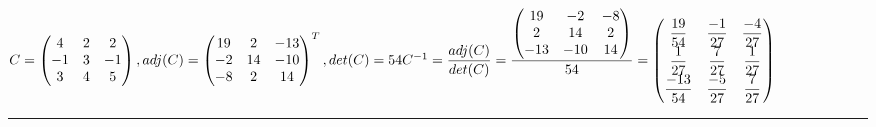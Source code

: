 \documentclass[fleqn]{article}
\begin{document}
\begin{enumerate}
    \textcolor{hwColor}{
      $
        C=\begin{pmatrix}
          4 & 2 & 2 \\ 
          -1 & 3 & -1 \\ 
          3 & 4 & 5
        \end{pmatrix}
        ,
        adj(C)=
        \begin{pmatrix}
        19 & 2 & -13 \\
        -2 & 14 & -10 \\
        -8 & 2 & 14
        \end{pmatrix}^T
        ,
        det(C)=54 \\
      C^{-1}= \dfrac{adj(C)}{det(C)}=\dfrac{
        \begin{pmatrix}
          19 & -2 & -8 \\
          2 & 14 & 2 \\
          -13 & -10 & 14
        \end{pmatrix}
      }{54}
      =
      \begin{pmatrix}
        \dfrac{19}{54} & \dfrac{-1}{27} & \dfrac{-4}{27} \\
        \dfrac{1}{27} & \dfrac{7}{27} & \dfrac{1}{27} \\
        \dfrac{-13}{54} & \dfrac{-5}{27} & \dfrac{7}{27}
      \end{pmatrix}
      $
    }

    \rule{16cm}{0.4pt}


\end{enumerate}
\end{document}
